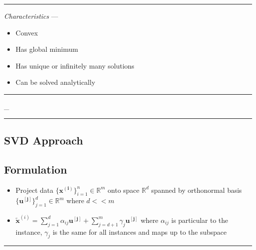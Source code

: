 {\color{lightgray}\hrule height 0.001mm}

\emph{Characteristics} --- 
\begin{itemize}
    \item Convex 
    \item Has global minimum
    \item Has unique or infinitely many solutions
    \item Can be solved analytically
\end{itemize}

{\color{black}\hrule height 0.001mm}
_
{\color{black}\hrule height 0.001mm}

\subsection*{SVD Approach}
\subsection*{Formulation}
\begin{itemize}
    \item Project data $\{\boldsymbol{x^{(i)}}\}_{i=1}^n \in \mathbb{R}^m$ onto space $\mathbb{R}^d$ spanned by orthonormal basis $\{\boldsymbol{u^{[j]}}\}_{j=1}^d \in \mathbb{R}^m$ where $d << m$
    \item $\tilde{\boldsymbol{x}}^{(i)} = \sum_{j=1}^d \alpha_{ij} \boldsymbol{u^{[j]}} + \sum_{j=d+1}^m \gamma_j \boldsymbol{u^{[j]}}$ where $\alpha_{ij}$ is particular to the instance, $\gamma_j$ is the same for all instances and maps up to the subspace
\end{itemize}

{\color{black}\hrule height 0.001mm}

